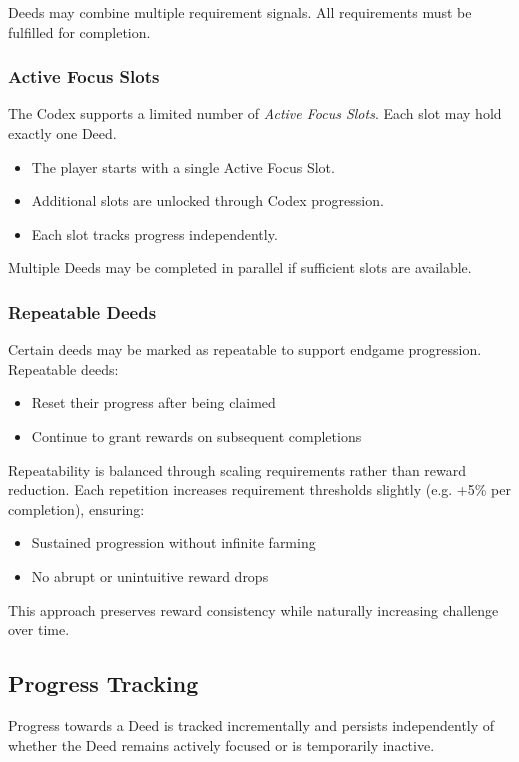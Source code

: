 Deeds may combine multiple requirement signals.
All requirements must be fulfilled for completion.

\subsubsection{Active Focus Slots}

The Codex supports a limited number of \emph{Active Focus Slots}.
Each slot may hold exactly one Deed.

\begin{itemize}
	\item The player starts with a single Active Focus Slot.
	\item Additional slots are unlocked through Codex progression.
	\item Each slot tracks progress independently.
\end{itemize}
Multiple Deeds may be completed in parallel if sufficient slots are available.

\subsubsection{Repeatable Deeds}
Certain deeds may be marked as repeatable to support endgame progression.
Repeatable deeds:
\begin{itemize}
	\item Reset their progress after being claimed
	\item Continue to grant rewards on subsequent completions
\end{itemize}
Repeatability is balanced through scaling requirements rather than reward reduction.
Each repetition increases requirement thresholds slightly (e.g. +5\% per completion), ensuring:
\begin{itemize}
	\item Sustained progression without infinite farming
	\item No abrupt or unintuitive reward drops
\end{itemize}
This approach preserves reward consistency while naturally increasing challenge over time.

\subsection{Progress Tracking}

Progress towards a Deed is tracked incrementally and persists independently of whether the Deed
remains actively focused or is temporarily inactive.

